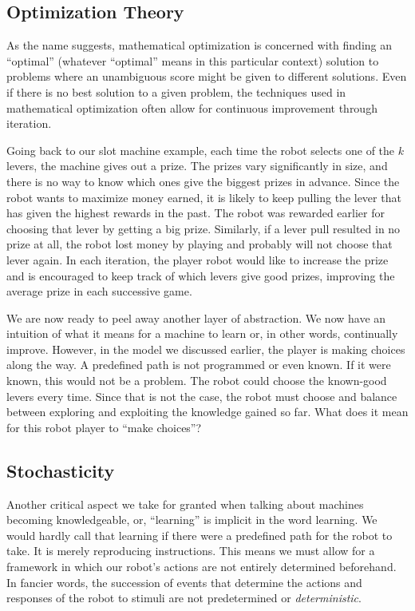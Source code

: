 \subsection{Optimization Theory}

As the name suggests, mathematical optimization is concerned with finding an
``optimal'' (whatever ``optimal'' means in this particular context) solution to
problems where an unambiguous score might be given to different solutions.  Even
if there is no best solution to a given problem, the techniques used in
mathematical optimization often allow for continuous improvement through
iteration.

Going back to our slot machine example, each time the robot selects one of the
$k$ levers, the machine gives out a prize. The prizes vary significantly in
size, and there is no way to know which ones give the biggest prizes in advance.
Since the robot wants to maximize money earned, it is likely to keep pulling the
lever that has given the highest rewards in the past. The robot was rewarded
earlier for choosing that lever by getting a big prize. Similarly, if a lever
pull resulted in no prize at all, the robot lost money by playing and probably
will not choose that lever again. In each iteration, the player robot would like
to increase the prize and is encouraged to keep track of which levers
give good prizes, improving the average prize in each successive game.

We are now ready to peel away another layer of abstraction. We now have an
intuition of what it means for a machine to learn or, in other words,
continually improve. However, in the model we discussed earlier, the player is
making choices along the way. A predefined path is not programmed or even known.
If it were known, this would not be a problem. The robot could choose the
known-good levers every time. Since that is not the case, the robot must choose
and balance between exploring and exploiting the knowledge gained so far. What
does it mean for this robot player to ``make choices''?

\subsection{Stochasticity}

Another critical aspect we take for granted when talking about machines becoming
knowledgeable, or, ``learning'' is implicit in the word learning. We would hardly
call that learning if there were a predefined path for the robot to take.  It is
merely reproducing instructions. This means we must allow for a framework in
which our robot's actions are not entirely determined beforehand. In fancier
words, the succession of events that determine the actions and responses of the
robot to stimuli are not predetermined or \textit{deterministic}.

